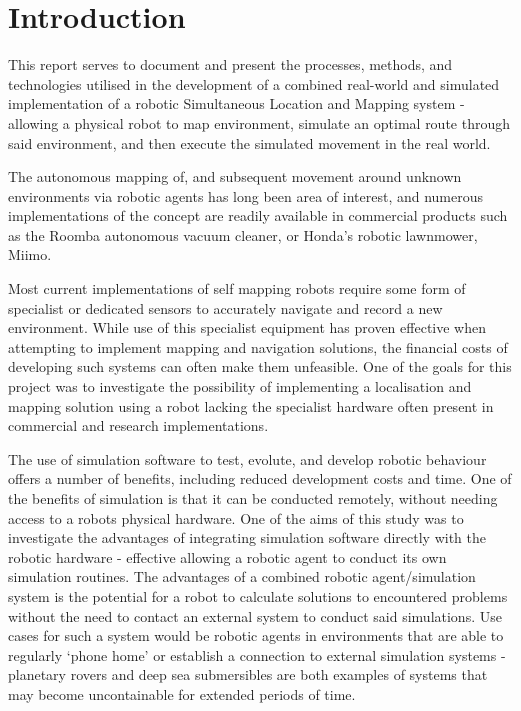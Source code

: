 \pagestyle{fancy}
\section{Introduction} \label{sec_introduction}
This report serves to document and present the processes, methods, and
technologies utilised in the development of a combined real-world and
simulated implementation of a robotic Simultaneous Location and Mapping
system - allowing a physical robot to map environment, simulate an optimal
route through said environment, and then execute the simulated movement in the
real world.

The autonomous mapping of, and subsequent movement around unknown environments
via robotic agents has long been area of interest, and numerous
implementations of the concept are readily available in commercial products
such as the Roomba autonomous vacuum cleaner, or Honda's  robotic lawnmower,
Miimo.

Most current implementations of self mapping robots require some form of
specialist or dedicated sensors to accurately navigate and record a new
environment.
While use of this specialist equipment has proven effective when attempting
to implement  mapping and navigation solutions, the financial costs of
developing such systems can often make them unfeasible.
One of the goals for this project was to investigate the possibility of
implementing a localisation and mapping solution using a robot lacking
the specialist hardware often present in commercial and research
implementations.

The use of simulation software to test, evolute, and develop robotic behaviour
offers a number of benefits, including reduced development costs and time.
One of the benefits of simulation is that it can be conducted remotely, without
needing access to a robots physical hardware.
One of the aims of this study was to investigate the advantages of integrating
simulation software directly with the robotic hardware - effective allowing a
robotic agent to conduct its own simulation routines.
The advantages of a combined robotic agent/simulation system is the potential
for a robot to calculate solutions to encountered problems without the need to
contact an external system to conduct said simulations.
Use cases for such a system would be robotic agents in environments that are
able to regularly `phone home' or establish a connection to  external
simulation systems - planetary rovers and deep sea submersibles  are both
examples of systems that may become uncontainable for extended periods of time.


